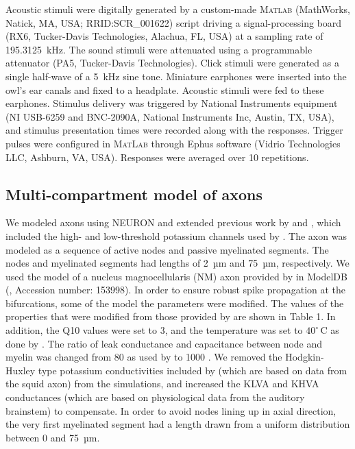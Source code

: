 \documentclass[]{elife}
\begin{document}
Acoustic stimuli were digitally generated by a custom-made
\textsc{Matlab} (MathWorks, Natick, MA, USA; RRID:SCR\_001622) script \citep{GithubRepo} driving a
signal-processing board (RX6, Tucker-Davis Technologies, Alachua, FL,
USA) at a sampling rate of 195.3125~kHz. The sound stimuli were
attenuated using a programmable attenuator (PA5, Tucker-Davis
Technologies). Click stimuli were generated as a single half-wave of a
5~kHz sine tone. Miniature earphones were inserted into the owl's ear
canals and fixed to a headplate. Acoustic stimuli were fed to these
earphones. Stimulus delivery was triggered by National Instruments
equipment (NI USB-6259 and BNC-2090A, National Instruments Inc, Austin,
TX, USA), and stimulus presentation times were recorded along with the
responses. Trigger pulses were configured in \textsc{MatLab} through
Ephus software (Vidrio Technologies LLC, Ashburn, VA, USA). Responses
were averaged over 10 repetitions.

\subsection{Multi-compartment model of
axons}\label{multi-compartment-model-of-axons}

We modeled axons using NEURON \citep{Hines1997NEURON, Hines2009NEURON}
and extended previous work by \citet{Simon1999Dendritic} and
\citet{Kuba2009Roles}, which included the high- and low-threshold
potassium channels used by \citet{Rathouz1998Characterization}. The axon
was modeled as a sequence of active nodes and passive myelinated
segments. The nodes and myelinated segments had lengths of 2~µm and
75~µm, respectively. We used the model of a nucleus magnocellularis (NM)
axon provided by \citet{Simon1999Dendritic} in ModelDB
(\citet{Hines2004ModelDB}, Accession number: 153998). In order to ensure
robust spike propagation at the bifurcations, some of the model the
parameters were modified. The values of the properties that were
modified from those provided by \citet{Simon1999Dendritic} are shown in
Table 1. In addition, the Q10 values were set to 3, and the temperature
was set to \(40^{\circ}\,\text{C}\) as done by \citet{Kuba2009Roles}. The
ratio of leak conductance and capacitance between node and myelin was
changed from 80 as used by \citet{Simon1999Dendritic} to 1000
\citep{Koch2004Biophysics}. We removed the Hodgkin-Huxley type potassium
conductivities included by \citet{Simon1999Dendritic} (which are based
on data from the squid axon) from the simulations, and increased the
KLVA and KHVA conductances (which are based on physiological data from
the auditory brainstem) to compensate. In order to avoid nodes lining up
in axial direction, the very first myelinated segment had a length drawn
from a uniform distribution between 0 and 75~µm.
\end{document}
